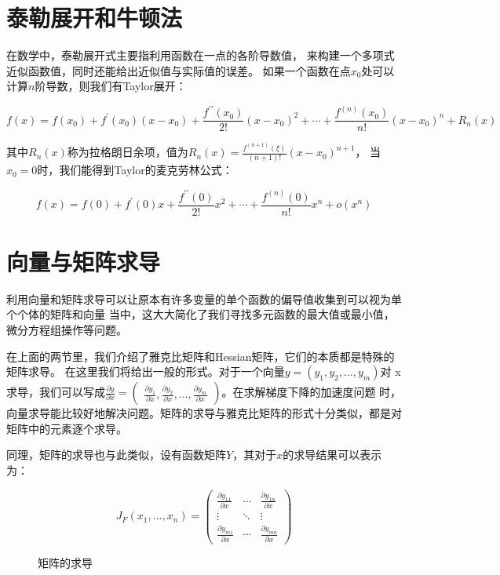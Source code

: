 \section{泰勒展开和牛顿法}
在数学中，泰勒展开式主要指利用函数在一点的各阶导数值，
来构建一个多项式近似函数值，同时还能给出近似值与实际值的误差。
如果一个函数在点$x_0$处可以计算$n$阶导数，则我们有Taylor展开：

\begin{equation*}
	f(x)=f\left(x_{0}\right)+f^{\prime}\left(x_{0}\right)\left(x-x_{0}\right)+\frac{f^{\prime \prime}\left(x_{0}\right)}{2 !}\left(x-x_{0}\right)^{2}+\cdots+\frac{f^{(n)}\left(x_{0}\right)}{n !}\left(x-x_{0}\right)^{n}+R_{n}(x)
\end{equation*}

其中$R_n(x)$称为拉格朗日余项，值为$R_{n}(x)=\frac{f^{(n+1)}(\xi)}{(n+1) !}\left(x-x_{0}\right)^{n+1}$，
当$x_0=0$时，我们能得到Taylor的麦克劳林公式：

\begin{equation*}
	f(x)=f(0)+f^{\prime}(0) x+\frac{f^{\prime \prime}(0)}{2 !} x^{2}+\cdots+\frac{f^{(n)}(0)}{n !} x^{n}+o\left(x^{n}\right)
\end{equation*}


\section{向量与矩阵求导}

利用向量和矩阵求导可以让原本有许多变量的单个函数的偏导值收集到可以视为单个个体的矩阵和向量
当中，这大大简化了我们寻找多元函数的最大值或最小值，微分方程组操作等问题。

在上面的两节里，我们介绍了雅克比矩阵和Hessian矩阵，它们的本质都是特殊的矩阵求导。
在这里我们将给出一般的形式。对于一个向量$y=(y_{1},y_{2},...,y_{m})$对
x求导，我们可以写成$\frac{\partial y}{\partial x}=\left( \begin{array}{ccc}{\frac{\partial y_{1}}{\partial x},\frac{\partial y_{2}}{\partial x},
...,\frac{\partial y_{m}}{\partial x}}\end{array}\right)$。在求解梯度下降的加速度问题
时，向量求导能比较好地解决问题。矩阵的求导与雅克比矩阵的形式十分类似，都是对矩阵中的元素逐个求导。

同理，矩阵的求导也与此类似，设有函数矩阵$Y$，其对于$x$的求导结果可以表示为：

\begin{figure}[!h]
	\begin{equation}
		J_F(x_1,...,x_n)=
		\left( \begin{matrix}
			\frac{\partial y_{11}}{\partial x} & \cdots & \frac{\partial y_{1n}}{\partial x}\\
			\vdots & \ddots & \vdots\\
			\frac{\partial y_{m1}}{\partial x} & \cdots & \frac{\partial y_{mn}}{\partial x}
			\end{matrix}
			\right )
	\end{equation}
	\caption{矩阵的求导}
\end{figure}


